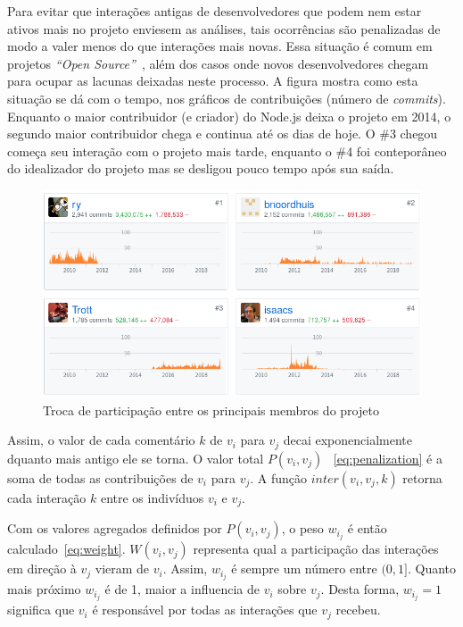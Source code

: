 \documentclass[12pt,openany,oneside,a4paper,english,brazil]{abntbibufjf}
\begin{document}
Para evitar que interações antigas de desenvolvedores que podem nem estar ativos mais no projeto enviesem as análises, tais ocorrências são penalizadas de modo a valer menos do que interações mais novas. Essa situação é comum em projetos \textit{``Open Source''}~\cite{fogel2005}, além dos casos onde novos desenvolvedores chegam para ocupar as lacunas deixadas neste processo. A figura mostra como esta situação se dá com o tempo, nos gráficos de contribuições (número de \textit{commits}). Enquanto o maior contribuidor (e criador) do Node.js deixa o projeto em 2014, o segundo maior contribuidor chega e continua até os dias de hoje. O \#3 chegou começa seu interação com o projeto mais tarde, enquanto o \#4 foi conteporâneo do idealizador do projeto mas se desligou pouco tempo após sua saída.

\begin{figure}[htbp]
 \includegraphics[width=\textwidth]{abandon-nodejs}
 \caption{Troca de participação entre os principais membros do projeto}\label{fig:abandon-nodejs}
\end{figure}

 Assim, o valor de cada comentário $k$ de $v_i$ para $v_j$ decai exponencialmente dquanto mais antigo ele se torna. O valor total $P(v_i,v_j)$ ~\eqref{eq:penalization} é a soma de todas as contribuições de  $v_i$ para $v_j$. A função $inter(v_i,v_j, k)$ retorna cada interação $k$ entre os indivíduos $v_i$ e $v_j$.

Com os valores agregados definidos por $P(v_i,v_j)$, o peso $w_i_j$ é então calculado~\eqref{eq:weight}. $W(v_i,v_j)$ representa qual a participação das interações em direção à $v_j$ vieram de $v_i$. Assim, $w_i_j$ é sempre um número entre $(0,1]$. Quanto mais próximo $w_i_j$ é de 1, maior a influencia de $v_i$ sobre $v_j$. Desta forma, $w_i_j = 1$ significa que $v_i$ é responsável por todas as interações que $v_j$ recebeu.
\end{document}

